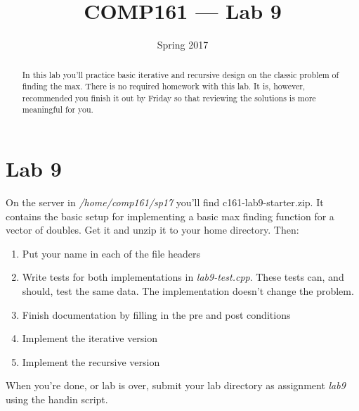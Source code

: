 \documentclass[]{tufte-handout}
\title{COMP161 --- Lab 9}
\author{}
\date{Spring 2017}
\begin{document}
\maketitle

\begin{abstract}
In this lab you'll practice basic iterative and recursive design on the classic problem of finding the max. There is no required homework with this lab. It is, however, recommended you finish it out by Friday so that reviewing the solutions is more meaningful for you.
\end{abstract}

\section{Lab 9}

On the server in \textit{/home/comp161/sp17} you'll find c161-lab9-starter.zip. It contains the basic setup for implementing a basic max finding function for a vector of doubles. Get it and unzip it to your home directory. Then:
\begin{enumerate}
\item Put your name in each of the file headers
\item Write tests for both implementations in \textit{lab9-test.cpp}.  These tests can, and should, test the same data. The implementation doesn't change the problem.
\item Finish documentation by filling in the pre and post conditions
\item Implement the iterative version
\item Implement the recursive version
\end{enumerate}

When you're done, or lab is over, submit your lab directory as assignment \textit{lab9} using the handin script.
\end{document}
